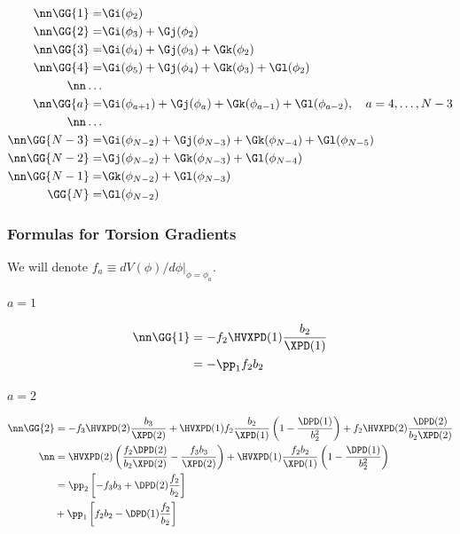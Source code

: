 \begin{align}
  \nn\GG{1}=&\Gi(\phi_2)\\
  \nn\GG{2}=&\Gi(\phi_3)+\Gj(\phi_2)\\
  \nn\GG{3}=&\Gi(\phi_4)+\Gj(\phi_3)+\Gk(\phi_2)\\
  \nn\GG{4}=&\Gi(\phi_5)+\Gj(\phi_4)+\Gk(\phi_3)+\Gl(\phi_2)\\
  \nn\ldots\\
  \nn\GG{a}=&\Gi(\phi_{a+1})+\Gj(\phi_a)+\Gk(\phi_{a-1})+\Gl(\phi_{a-2}),\quad a=4,\ldots,N-3\\
  \nn\ldots\\
  \nn\GG{N-3}=&\Gi(\phi_{N-2})+\Gj(\phi_{N-3})+\Gk(\phi_{N-4})+\Gl(\phi_{N-5})\\
  \nn\GG{N-2}=&\Gj(\phi_{N-2})+\Gk(\phi_{N-3})+\Gl(\phi_{N-4})\\
  \nn\GG{N-1}=&\Gk(\phi_{N-2})+\Gl(\phi_{N-3})\\
  \GG{N}=&\Gl(\phi_{N-2})
\end{align}

\subsubsection{Formulas for Torsion Gradients}

We will denote $f_a\equiv dV(\phi)/d\phi|_{\phi=\phi_a}$.

\paragraph{$a=1$}
\begin{align}
  \nn\GG{1}&=-f_2\HVXPD(1)\frac{b_2}{\XPD(1)}\\
	&=-\pp_1f_2b_2
\end{align}
\paragraph{$a=2$} 
  \begin{align}
    \nn\GG{2}&=-f_3\HVXPD(2)\frac{b_3}{\XPD(2)}+\HVXPD(1)f_2\frac{b_2}{\XPD(1)}
    \left(1-\frac{\DPD(1)}{b_2^2}\right)+
    f_2\HVXPD(2)\frac{\DPD(2)}{b_2\XPD(2)}\\
    \nn&=\HVXPD(2)\left(\frac{f_2\DPD(2)}{b_2\XPD(2)}-\frac{f_3b_3}{\XPD(2)}\right)
    +\HVXPD(1)\frac{f_2b_2}{\XPD(1)}\left(1-\frac{\DPD(1)}{b_2^2}\right)\\
    &=\pp_2\left[ -f_3b_3+\DPD(2)\frac{f_2}{b_2}\right]\\
    &+\pp_1\left[f_2b_2-\DPD(1)\frac{f_2}{b_2}\right]
  \end{align}
